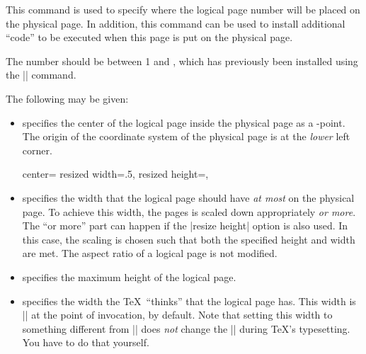 \begin{command}{\pgfpageslogicalpageoptions{}}
    This command is used to specify where the logical page number  will be placed on the physical page. In addition, this command
    can be used to install additional ``code'' to be executed when this page is
    put on the physical page.

    The number  should be between 1 and , which has previously been installed using the
    |\pgfpagesphysicalpageoptions| command.

    The following  may be given:
    \begin{itemize}
        \item {} specifies the center of the
            logical page inside the physical page as a \pgfname-point. The
            origin of the coordinate system of the physical page is at the
            \emph{lower} left corner.
\begin{codeexample}
{%
  center=\pgfpoint{.25\pgfphysicalwidth}{.5\pgfphysicalheight}%
  resized width=.5\pgfphysicalwidth,%
  resized height=\pgfphysicalheight,%
}
\end{codeexample}
        \item {} specifies the width that
            the logical page should have \emph{at most} on the physical page.
            To achieve this width, the pages is scaled down appropriately
            \emph{or more}. The ``or more'' part can happen if the
            |resize height| option is also used. In this case, the scaling is
            chosen such that both the specified height and width are met. The
            aspect ratio of a logical page is not modified.
        \item {} specifies the maximum
            height of the logical page.
        \item {} specifies the width the
            \TeX\ ``thinks'' that the logical page has. This width is
            |\paperwidth| at the point of invocation, by default. Note that
            setting this width to something different from |\paperwidth| does
            \emph{not} change the |\pagewidth| during \TeX's typesetting. You
            have to do that yourself.


\end{itemize}
\end{command}
